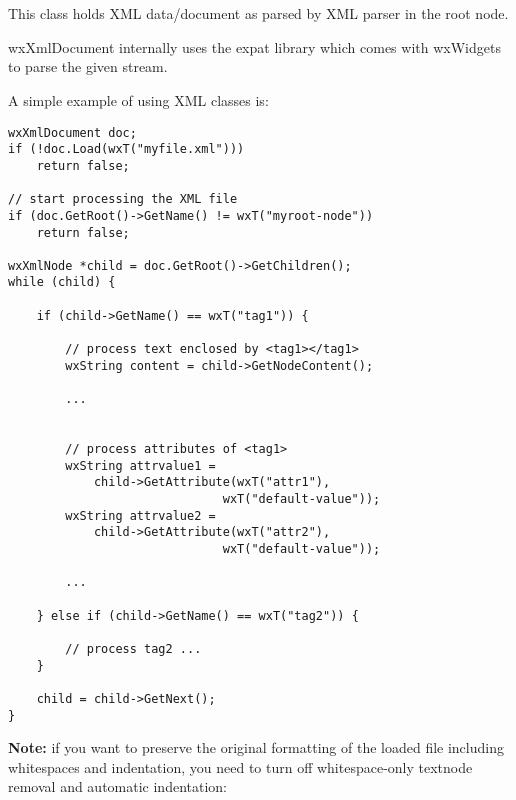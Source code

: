 
\section{}\label{wxxmldocument}

This class holds XML data/document as parsed by XML parser in the root node.

wxXmlDocument internally uses the expat library which comes with wxWidgets to parse the given stream.

A simple example of using XML classes is:

\begin{verbatim}
wxXmlDocument doc;
if (!doc.Load(wxT("myfile.xml")))
    return false;

// start processing the XML file
if (doc.GetRoot()->GetName() != wxT("myroot-node"))
    return false;

wxXmlNode *child = doc.GetRoot()->GetChildren();
while (child) {

    if (child->GetName() == wxT("tag1")) {

        // process text enclosed by <tag1></tag1>
        wxString content = child->GetNodeContent();

        ...


        // process attributes of <tag1>
        wxString attrvalue1 = 
            child->GetAttribute(wxT("attr1"), 
                              wxT("default-value"));
        wxString attrvalue2 = 
            child->GetAttribute(wxT("attr2"), 
                              wxT("default-value"));

        ...

    } else if (child->GetName() == wxT("tag2")) {

        // process tag2 ...
    }

    child = child->GetNext();
}
\end{verbatim}

{\bf Note:} if you want to preserve the original formatting of the loaded file including whitespaces
and indentation, you need to turn off whitespace-only textnode removal and automatic indentation:

